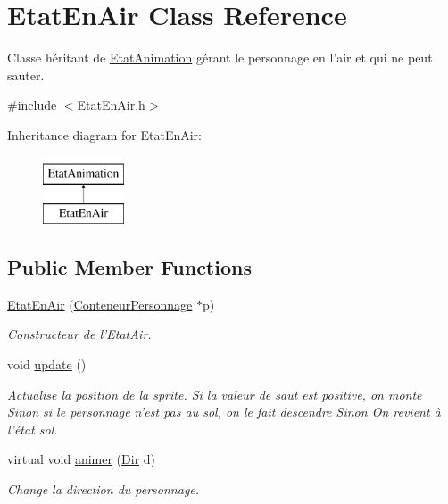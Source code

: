 \hypertarget{classEtatEnAir}{\section{Etat\-En\-Air Class Reference}
\label{classEtatEnAir}
}


Classe héritant de \hyperlink{classEtatAnimation}{Etat\-Animation} gérant le personnage en l'air et qui ne peut sauter.  




{\ttfamily \#include $<$Etat\-En\-Air.\-h$>$}

Inheritance diagram for Etat\-En\-Air\-:\begin{figure}[H]
\begin{center}
\leavevmode
\includegraphics[height=2.000000cm]{classEtatEnAir}
\end{center}
\end{figure}
\subsection*{Public Member Functions}
\begin{DoxyCompactItemize}
\item 
\hyperlink{classEtatEnAir_a7d0a207ab8fe76e7653f19c19db73630}{Etat\-En\-Air} (\hyperlink{classConteneurPersonnage}{Conteneur\-Personnage} $\ast$p)
\begin{DoxyCompactList}\small\item\em Constructeur de l'Etat\-Air. \end{DoxyCompactList}\item 
\hypertarget{classEtatEnAir_a1be039e8e0f39fb1085cc3257067ff07}{void \hyperlink{classEtatEnAir_a1be039e8e0f39fb1085cc3257067ff07}{update} ()}\label{classEtatEnAir_a1be039e8e0f39fb1085cc3257067ff07}

\begin{DoxyCompactList}\small\item\em Actualise la position de la sprite. Si la valeur de saut est positive, on monte Sinon si le personnage n'est pas au sol, on le fait descendre Sinon On revient à l'état sol. \end{DoxyCompactList}\item 
virtual void \hyperlink{classEtatEnAir_aab27027ec2505fd3675266ae39834dee}{animer} (\hyperlink{Espace_8h_a7cf6e8c5a5bc5e7b2afef3647870b1c4}{Dir} d)
\begin{DoxyCompactList}\small\item\em Change la direction du personnage. \end{DoxyCompactList}\end{DoxyCompactItemize}

